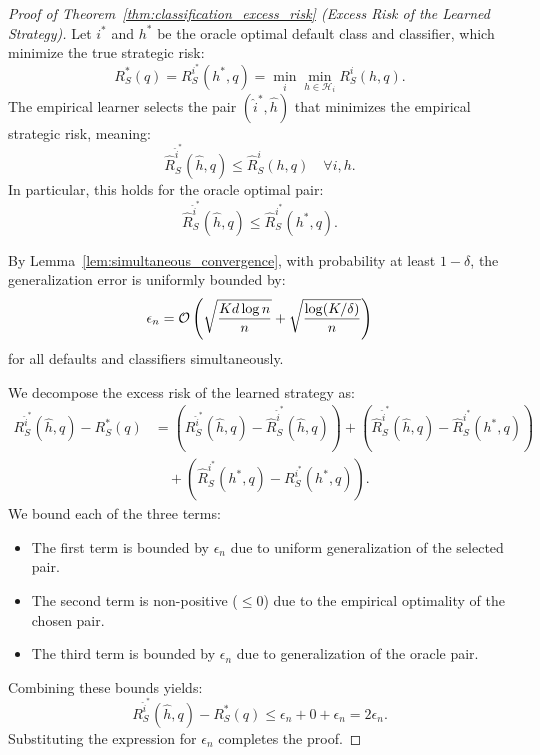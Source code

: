 \label{app:proof_classification_excess_risk}
\begin{proof}[Proof of Theorem~\ref{thm:classification_excess_risk} (Excess Risk of the Learned Strategy)]
Let $i^*$ and $h^*$ be the oracle optimal default class and classifier, which minimize the true strategic risk:
\begin{equation}
    R^*_S(q) = R^{i^*}_S(h^*, q) = \min_{i} \min_{h \in \mathcal{H}_i} R^i_S(h, q).
\end{equation}
The empirical learner selects the pair $(\hat{i}^*, \hat{h})$ that minimizes the empirical strategic risk, meaning:
\begin{equation}
    \hat{R}^{\hat{i}^*}_S(\hat{h}, q) \le \hat{R}^i_S(h, q) \quad \forall i, h.
\end{equation}
In particular, this holds for the oracle optimal pair:
\begin{equation}
    \hat{R}^{\hat{i}^*}_S(\hat{h}, q) \le \hat{R}^{i^*}_S(h^*, q).
\end{equation}

By Lemma~\ref{lem:simultaneous_convergence}, with probability at least $1 - \delta$, the generalization error is uniformly bounded by:
\begin{equation}
    \epsilon_n = \mathcal{O}\left( \sqrt{\frac{K d \log n}{n}} + \sqrt{\frac{\log(K/\delta)}{n}} \right)
\end{equation}
for all defaults and classifiers simultaneously.

We decompose the excess risk of the learned strategy as:
\begin{align}
    R^{\hat{i}^*}_S(\hat{h}, q) - R^*_S(q) &= \left( R^{\hat{i}^*}_S(\hat{h}, q) - \hat{R}^{\hat{i}^*}_S(\hat{h}, q) \right) + \left( \hat{R}^{\hat{i}^*}_S(\hat{h}, q) - \hat{R}^{i^*}_S(h^*, q) \right) \nonumber \\
    &\quad + \left( \hat{R}^{i^*}_S(h^*, q) - R^{i^*}_S(h^*, q) \right).
\end{align}
We bound each of the three terms:
\begin{itemize}
    \item The first term is bounded by $\epsilon_n$ due to uniform generalization of the selected pair.
    \item The second term is non-positive ($\le 0$) due to the empirical optimality of the chosen pair.
    \item The third term is bounded by $\epsilon_n$ due to generalization of the oracle pair.
\end{itemize}
Combining these bounds yields:
\begin{equation}
    R^{\hat{i}^*}_S(\hat{h}, q) - R^*_S(q) \le \epsilon_n + 0 + \epsilon_n = 2\epsilon_n.
\end{equation}
Substituting the expression for $\epsilon_n$ completes the proof.
\end{proof}

